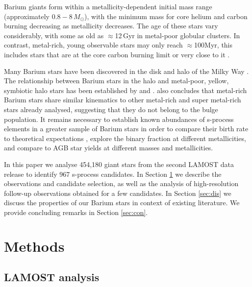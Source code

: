 \documentclass[a4paper,fleqn,usenatbib]{mnras}
\begin{document}
Barium giants form within a metallicity-dependent initial mass range (approximately $0.8 - 8\,M_{\odot}$), with the minimum mass for core helium and carbon burning decreasing as metallicity decreases. The age of these stars vary considerably, with some as old as $\approx$12\,Gyr in metal-poor globular clusters. In contrast, metal-rich, young observable stars may only reach $\approx$100Myr, this includes stars that are at the core carbon burning limit or very close to it \citep[e.g.,][]{whitelock2013}.

Many Barium stars have been discovered in the disk and halo of the Milky Way \citep{gomez1997,mennessier1997}. 
The relationship between Barium stars in the halo \citep[e.g.,][]{junqueira2001,drake2008,pereira2009,allen2006} and metal-poor, yellow, symbiotic halo stars has been established by \citet{jorissen2005} and \citet{pereira2009}. \citet{pereira2011} also concludes that metal-rich Barium stars share similar kinematics to other metal-rich and super metal-rich stars already analysed, suggesting that they do not belong to the bulge population. It remains necessary to establish known abundances of s-process elements in a greater sample of Barium stars in order to compare their birth rate to theoretical expectations \citep{han1995}, explore the binary fraction at different metallicities, and compare to AGB star yields at different masses and metallicities.

In this paper we analyse 454,180 giant stars from the second LAMOST data release \citep{luo2015} to identify 967 s-process candidates. In Section \ref{sec:methods} we describe the observations and candidate selection, as well as the analysis of high-resolution follow-up observations obtained for a few candidates. In Section \ref{sec:dis} we discuss the properties of our Barium stars in context of existing literature. We provide concluding remarks in Section \ref{sec:con}.

\section{Methods} \label{sec:methods}
\subsection{LAMOST analysis}
\end{document}
